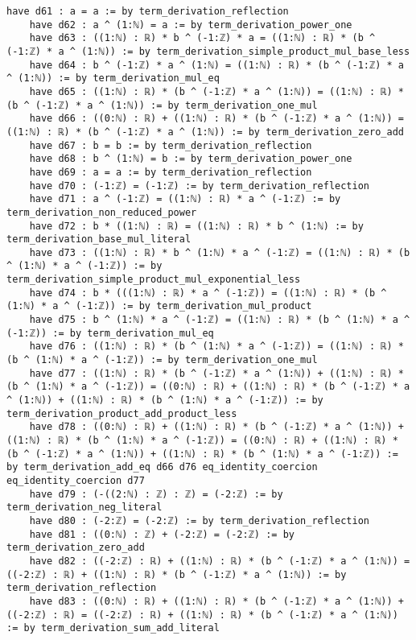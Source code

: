 \documentclass{article}
\begin{document}
\begin{tcolorbox}[colback=white!10, width=\linewidth]
\begin{lstlisting}[language=Lean4]
    have d61 : a = a := by term_derivation_reflection
    have d62 : a ^ (1:ℕ) = a := by term_derivation_power_one
    have d63 : ((1:ℕ) : ℝ) * b ^ (-1:ℤ) * a = ((1:ℕ) : ℝ) * (b ^ (-1:ℤ) * a ^ (1:ℕ)) := by term_derivation_simple_product_mul_base_less
    have d64 : b ^ (-1:ℤ) * a ^ (1:ℕ) = ((1:ℕ) : ℝ) * (b ^ (-1:ℤ) * a ^ (1:ℕ)) := by term_derivation_mul_eq
    have d65 : ((1:ℕ) : ℝ) * (b ^ (-1:ℤ) * a ^ (1:ℕ)) = ((1:ℕ) : ℝ) * (b ^ (-1:ℤ) * a ^ (1:ℕ)) := by term_derivation_one_mul
    have d66 : ((0:ℕ) : ℝ) + ((1:ℕ) : ℝ) * (b ^ (-1:ℤ) * a ^ (1:ℕ)) = ((1:ℕ) : ℝ) * (b ^ (-1:ℤ) * a ^ (1:ℕ)) := by term_derivation_zero_add
    have d67 : b = b := by term_derivation_reflection
    have d68 : b ^ (1:ℕ) = b := by term_derivation_power_one
    have d69 : a = a := by term_derivation_reflection
    have d70 : (-1:ℤ) = (-1:ℤ) := by term_derivation_reflection
    have d71 : a ^ (-1:ℤ) = ((1:ℕ) : ℝ) * a ^ (-1:ℤ) := by term_derivation_non_reduced_power
    have d72 : b * ((1:ℕ) : ℝ) = ((1:ℕ) : ℝ) * b ^ (1:ℕ) := by term_derivation_base_mul_literal
    have d73 : ((1:ℕ) : ℝ) * b ^ (1:ℕ) * a ^ (-1:ℤ) = ((1:ℕ) : ℝ) * (b ^ (1:ℕ) * a ^ (-1:ℤ)) := by term_derivation_simple_product_mul_exponential_less
    have d74 : b * (((1:ℕ) : ℝ) * a ^ (-1:ℤ)) = ((1:ℕ) : ℝ) * (b ^ (1:ℕ) * a ^ (-1:ℤ)) := by term_derivation_mul_product
    have d75 : b ^ (1:ℕ) * a ^ (-1:ℤ) = ((1:ℕ) : ℝ) * (b ^ (1:ℕ) * a ^ (-1:ℤ)) := by term_derivation_mul_eq
    have d76 : ((1:ℕ) : ℝ) * (b ^ (1:ℕ) * a ^ (-1:ℤ)) = ((1:ℕ) : ℝ) * (b ^ (1:ℕ) * a ^ (-1:ℤ)) := by term_derivation_one_mul
    have d77 : ((1:ℕ) : ℝ) * (b ^ (-1:ℤ) * a ^ (1:ℕ)) + ((1:ℕ) : ℝ) * (b ^ (1:ℕ) * a ^ (-1:ℤ)) = ((0:ℕ) : ℝ) + ((1:ℕ) : ℝ) * (b ^ (-1:ℤ) * a ^ (1:ℕ)) + ((1:ℕ) : ℝ) * (b ^ (1:ℕ) * a ^ (-1:ℤ)) := by term_derivation_product_add_product_less
    have d78 : ((0:ℕ) : ℝ) + ((1:ℕ) : ℝ) * (b ^ (-1:ℤ) * a ^ (1:ℕ)) + ((1:ℕ) : ℝ) * (b ^ (1:ℕ) * a ^ (-1:ℤ)) = ((0:ℕ) : ℝ) + ((1:ℕ) : ℝ) * (b ^ (-1:ℤ) * a ^ (1:ℕ)) + ((1:ℕ) : ℝ) * (b ^ (1:ℕ) * a ^ (-1:ℤ)) := by term_derivation_add_eq d66 d76 eq_identity_coercion eq_identity_coercion d77
    have d79 : (-((2:ℕ) : ℤ) : ℤ) = (-2:ℤ) := by term_derivation_neg_literal
    have d80 : (-2:ℤ) = (-2:ℤ) := by term_derivation_reflection
    have d81 : ((0:ℕ) : ℤ) + (-2:ℤ) = (-2:ℤ) := by term_derivation_zero_add
    have d82 : ((-2:ℤ) : ℝ) + ((1:ℕ) : ℝ) * (b ^ (-1:ℤ) * a ^ (1:ℕ)) = ((-2:ℤ) : ℝ) + ((1:ℕ) : ℝ) * (b ^ (-1:ℤ) * a ^ (1:ℕ)) := by term_derivation_reflection
    have d83 : ((0:ℕ) : ℝ) + ((1:ℕ) : ℝ) * (b ^ (-1:ℤ) * a ^ (1:ℕ)) + ((-2:ℤ) : ℝ) = ((-2:ℤ) : ℝ) + ((1:ℕ) : ℝ) * (b ^ (-1:ℤ) * a ^ (1:ℕ)) := by term_derivation_sum_add_literal

\end{lstlisting}
\end{tcolorbox}
\end{document}
